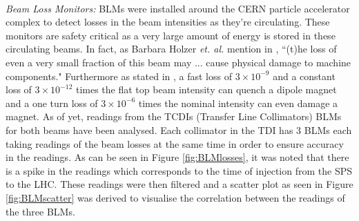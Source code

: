 \documentclass[12pt, twoside]{report}
\begin{document}
	\paragraph{ }\textit{Beam Loss Monitors:} BLMs were installed around the CERN particle accelerator complex to detect losses in the beam intensities as they're circulating. These monitors are safety critical as a very large amount of energy is stored in these circulating beams. In fact, as Barbara Holzer \textit{et. al.} mention in \cite{r:BLMs}, ``(t)he loss of even a very small fraction of this beam may ... cause physical damage to machine components." Furthermore as stated in \cite{r:BLMs}, a fast loss of $3\times10^{-9}$ and a constant loss of $3\times10^{-12}$ times the flat top beam intensity can quench a dipole magnet and a one turn loss of $3\times10^{-6}$ times the nominal intensity can even damage a magnet. As of yet, readings from the TCDIs (Transfer Line Collimators) BLMs for both beams have been analysed. Each collimator in the TDI has 3 BLMs each taking readings of the beam losses at the same time in order to ensure accuracy in the readings. As can be seen in Figure \ref{fig:BLMlosses}, it was noted that there is a spike in the readings which corresponds to the time of injection from the SPS to the LHC. These readings were then filtered and a scatter plot as seen in Figure \ref{fig:BLMscatter} was derived to visualise the correlation between the readings of the three BLMs. 
\end{document}
